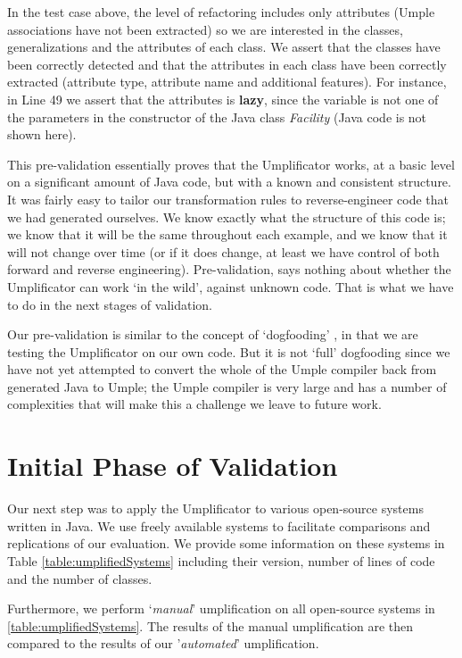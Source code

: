 In the test case above, the level of refactoring includes only attributes (Umple associations have not been extracted) so we are interested in the classes, generalizations and the attributes of each class. We assert that the classes have been correctly detected and that the attributes in each class have been correctly extracted (attribute type, attribute name and additional features). For instance, in Line 49 we assert that the attributes is \textbf{lazy}, since the variable is not one of the parameters in the constructor of the Java class \textit{Facility} (Java code is not shown here).

This pre-validation essentially proves that the Umplificator works, at a basic level on a significant amount of Java code, but with a known and consistent structure. It was fairly easy to tailor our transformation rules to reverse-engineer code that we had generated ourselves. We know exactly what the structure of this code is; we know that it will be the same throughout each example, and we know that it will not change over time (or if it does change, at least we have control of both forward and reverse engineering). Pre-validation, says nothing about whether the Umplificator can work `in the wild', against unknown code. That is what we have to do in the next stages of validation.

Our pre-validation is similar to the concept of `dogfooding' \cite{ash2003web}, in that we are testing the Umplificator on our own code. But it is not `full' dogfooding since we have not yet attempted to convert the whole of the Umple compiler back from generated Java to Umple; the Umple compiler is very large and has a number of complexities that will make this a challenge we leave to future work.


\section{Initial Phase of Validation}

Our next step was to apply the Umplificator to various open-source systems written in Java. We use freely available systems to facilitate comparisons and replications of our evaluation. We provide some information on these systems in Table \ref{table:umplifiedSystems} including their version, number of lines of code and the number of classes.

Furthermore, we perform `\textit{manual}' umplification on all open-source systems in \ref{table:umplifiedSystems}. The results of the manual umplification are then compared to the results of our '\textit{automated}' umplification. 


